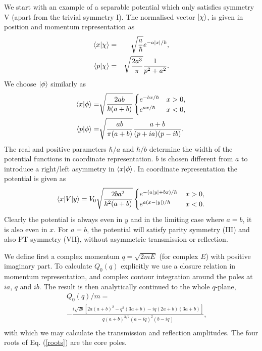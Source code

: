 We start with an example of a separable potential which only satisfies symmetry V (apart from the trivial symmetry I). The normalised vector $\ket{\chi}$, is given in position and momentum representation as
%
\begin{eqnarray}
\braket{x}{\chi}&=&\sqrt{\frac{a}{\hbar}} e^{-a \left| x \right|/\hbar},
\nonumber \\
\braket{p}{\chi}&=& \sqrt{\frac{2 a^3}{\pi}} \frac{1}{p^2+a^2}.
\end{eqnarray}
%
We choose $\ket{\phi}$ similarly as
%
\begin{eqnarray}
\braket{x}{\phi}=&\sqrt{\frac{2ab}{\hbar (a+b)}} \begin{cases}
 e^{-b x/\hbar} &x>0,\\ e^{a x/\hbar}  &x<0,
   \end{cases}\nonumber \\
\braket{p}{\phi}=& \sqrt{\frac{ab}{\pi (a+b)}}\frac{a+b}{(p+i a)(p-i b)}.
\end{eqnarray}
%
The real and positive parameters $\hbar/ a$ and $\hbar/ b$ determine the width of the potential functions in coordinate representation.
$b$ is chosen different from $a$ to introduce a right/left  asymmetry in $\braket{x}{\phi}$.
In coordinate representation the potential is given as
%
\begin{eqnarray}
\la x|V|y\ra = V_{0} \sqrt{\frac{2 b a^2}{\hbar^2 (a+b)}} \begin{cases}
 e^{-(a \left| y \right|+b x)/\hbar} \, &x>0,\\ e^{a (x-\left| y \right|)/\hbar} \,  &x<0.
   \end{cases} \label{TRpot}
\end{eqnarray}
%
Clearly the potential is always even in $y$ and in the limiting case where $a=b$, it is also even in $x$. For $a=b$, the potential will satisfy parity symmetry (III) and also PT symmetry (VII), without asymmetric transmission or reflection.

We define first a complex momentum $q=\sqrt{2 m E}$ (for complex $E$) with positive imaginary part.
To calculate $Q_{0}(q)$ explicitly we use a closure relation in momentum representation, and
complex contour integration around the poles at $ia$, $q$ and $ib$.
The result is then analytically continued to the whole $q$-plane,
%
\begin{eqnarray}
&&Q_{0}(q)/m=
\nonumber\\
&&-\frac{i \sqrt{2b} \left[2 a (a+b)^2-q^2 (3 a+b)-i q (2 a+b) (3 a+b)\right]}{q (a+b)^{3/2} (a-i q)^2 (b-i q)},
\nonumber\\
\label{eq:ResolvantVSymm}
\end{eqnarray}
%
with which we may calculate the transmission and reflection amplitudes.
The four roots of Eq. (\ref{roots}) are the core poles.

